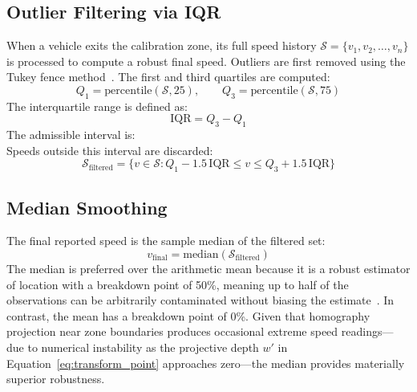 \documentclass[12pt]{report}
\begin{document}
\subsection{Outlier Filtering via IQR}

When a vehicle exits the calibration zone, its full speed history $\mathcal{S} = \{v_1, v_2, \ldots, v_n\}$ is processed to compute a robust final speed.
Outliers are first removed using the Tukey fence method~\cite{Tukey1977}.
The first and third quartiles are computed:
\begin{equation}
    Q_1 = \text{percentile}(\mathcal{S}, 25), \qquad Q_3 = \text{percentile}(\mathcal{S}, 75)
    \label{eq:quartiles}
\end{equation}
The interquartile range is defined as:
\begin{equation}
    \text{IQR} = Q_3 - Q_1
    \label{eq:iqr}
\end{equation}
The admissible interval is:
\begin{equation}
    [Q_1 - 1.5 \cdot \text{IQR},\quad Q_3 + 1.5 \cdot \text{IQR}]
    \label{eq:tukey_fence}
\end{equation}
Speeds outside this interval are discarded:
\begin{equation}
    \mathcal{S}_\text{filtered} = \{v \in \mathcal{S} : Q_1 - 1.5\,\text{IQR} \leq v \leq Q_3 + 1.5\,\text{IQR}\}
    \label{eq:filtered_speeds}
\end{equation}

\subsection{Median Smoothing}

The final reported speed is the sample median of the filtered set:
\begin{equation}
    v_\text{final} = \text{median}(\mathcal{S}_\text{filtered})
    \label{eq:median_speed}
\end{equation}
The median is preferred over the arithmetic mean because it is a robust estimator of location with a breakdown point of 50\%, meaning up to half of the observations can be arbitrarily contaminated without biasing the estimate~\cite{Hampel1974}.
In contrast, the mean has a breakdown point of 0\%.
Given that homography projection near zone boundaries produces occasional extreme speed readings---due to numerical instability as the projective depth $w'$ in Equation~\eqref{eq:transform_point} approaches zero---the median provides materially superior robustness.
\end{document}
